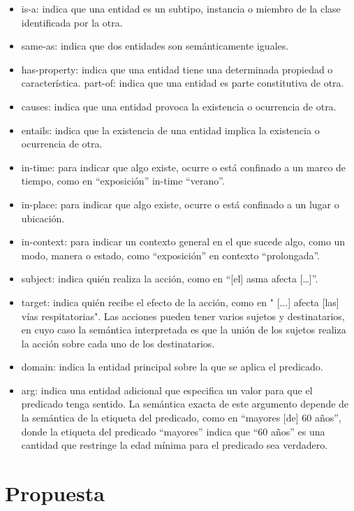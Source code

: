 \documentclass[10pt]{article} %
\begin{document}
	\begin{itemize}
		\item is-a: indica que una entidad es un subtipo, instancia o miembro de la clase identificada por la otra.
		\item same-as: indica que dos entidades son semánticamente iguales.
		\item has-property: indica que una entidad tiene una determinada propiedad o característica.
		part-of: indica que una entidad es parte constitutiva de otra.
		\item  causes: indica que una entidad provoca la existencia o ocurrencia de otra.
		\item entails: indica que la existencia de una entidad implica la existencia o ocurrencia de otra.
		\item in-time: para indicar que algo existe, ocurre o está confinado a un marco de tiempo, como en “exposición” in-time “verano”.
		\item in-place: para indicar que algo existe, ocurre o está confinado a un lugar o ubicación.
		\item in-context: para indicar un contexto general en el que sucede algo, como un modo, manera o estado, como “exposición” en contexto “prolongada”.
		\item subject: indica quién realiza la acción, como en “[el] asma afecta […]”.
		\item target: indica quién recibe el efecto de la acción, como en " [...] afecta [las] v\'ias respitatorias". Las acciones pueden tener varios sujetos y destinatarios, en cuyo caso la semántica interpretada es que la unión de los sujetos realiza la acción sobre cada uno de los destinatarios.
		\item domain: indica la entidad principal sobre la que se aplica el predicado.
		\item arg: indica una entidad adicional que especifica un valor para que el predicado tenga sentido. La semántica exacta de este argumento depende de la semántica de la etiqueta del predicado, como en “mayores [de] 60 años”, donde la etiqueta del predicado “mayores” indica que “60 años” es una cantidad que restringe la edad mínima para el predicado sea verdadero.
		
	\end{itemize}
	
	\section{Propuesta}
\end{document}
